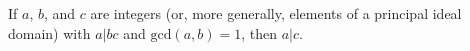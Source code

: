 \documentclass[12pt]{article}
\begin{document}
If $a$, $b$, and $c$ are integers (or, more generally, elements of a principal ideal domain) with $a | bc$ and $\mbox{gcd}(a,b)=1$, then $a | c$.
\end{document}
